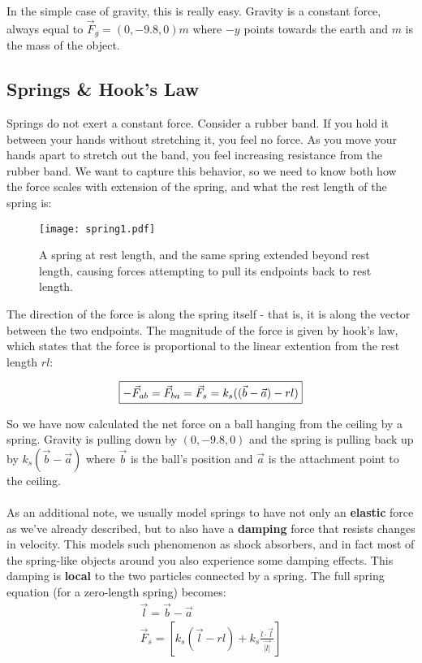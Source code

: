\documentclass[]{article}
\begin{document}
In the simple case of gravity, this is really easy. Gravity is a constant force, always equal to $\vec{F}_g = (0,-9.8,0)m$ where $-y$ points towards the earth and $m$ is the mass of the object.
 
\subsection{Springs \& Hook's Law}

Springs do not exert a constant force. Consider a rubber band. If you hold it between your hands without stretching it, you feel no force. As you move your hands apart to stretch out the band, you feel increasing resistance from the rubber band. We want to capture this behavior, so we need to know both how the force scales with extension of the spring, and what the rest length of the spring is:

\begin{figure}[htp]
    \centering
    \texttt{[image: spring1.pdf]}
    \caption{A spring at rest length, and the same spring extended beyond rest length, causing forces attempting to pull its endpoints back to rest length.}
\end{figure}

The direction of the force is along the spring itself - that is, it is along the vector between the two endpoints. The magnitude of the force is given by hook's law, which states that the force is proportional to the linear extention from the rest length $rl$:

\begin{equation}
	\fbox{$-\vec{F}_{ab} = \vec{F}_{ba} = \vec{F}_s = k_s((\vec{b} - \vec{a}) - rl)$}
\end{equation}

So we have now calculated the net force on a ball hanging from the ceiling by a spring. Gravity is pulling down by $(0,-9.8,0)$ and the spring is pulling back up by $k_s(\vec{b} - \vec{a})$ where $\vec{b}$ is the ball's position and $\vec{a}$ is the attachment point to the ceiling.

\paragraph{}

As an additional note, we usually model springs to have not only an \textbf{elastic} force as we've already described, but to also have a \textbf{damping} force that resists changes in velocity. This models such phenomenon as shock absorbers, and in fact most of the spring-like objects around you also experience some damping effects. This damping is \textbf{local} to the two particles connected by a spring. The full spring equation (for a zero-length spring) becomes:
\begin{eqnarray}
	\vec{l} = \vec{b} - \vec{a} \\
	\vec{F}_s = \left[k_s(\vec{l} - rl) + k_s\frac{\dot{l} \cdot \vec{l}}{\vec{\left|l\right|}}\right]
\end{eqnarray}
\end{document}

